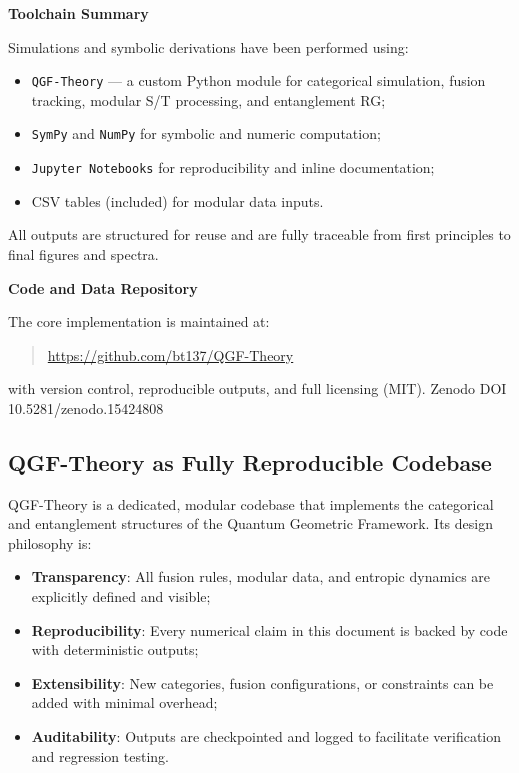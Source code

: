 \documentclass[11pt]{article}
\begin{document}
\vspace{0.5em}
\noindent\textbf{Toolchain Summary}

Simulations and symbolic derivations have been performed using:

\begin{itemize}
  \item \texttt{QGF-Theory} — a custom Python module for categorical simulation, fusion tracking, modular S/T processing, and entanglement RG;
  \item \texttt{SymPy} and \texttt{NumPy} for symbolic and numeric computation;
  \item \texttt{Jupyter Notebooks} for reproducibility and inline documentation;
  \item CSV tables (included) for modular data inputs.
\end{itemize}

All outputs are structured for reuse and are fully traceable from first principles to final figures and spectra.

\vspace{0.5em}
\noindent\textbf{Code and Data Repository}

The core implementation is maintained at:

\begin{quote}
\url{https://github.com/bt137/QGF-Theory}
\end{quote}

with version control, reproducible outputs, and full licensing (MIT). Zenodo DOI 10.5281/zenodo.15424808



\subsection{QGF-Theory as Fully Reproducible Codebase}

QGF-Theory is a dedicated, modular codebase that implements the categorical and entanglement structures of the Quantum Geometric Framework. Its design philosophy is:

\begin{itemize}
  \item \textbf{Transparency}: All fusion rules, modular data, and entropic dynamics are explicitly defined and visible;
  \item \textbf{Reproducibility}: Every numerical claim in this document is backed by code with deterministic outputs;
  \item \textbf{Extensibility}: New categories, fusion configurations, or constraints can be added with minimal overhead;
  \item \textbf{Auditability}: Outputs are checkpointed and logged to facilitate verification and regression testing.
\end{itemize}
\end{document}

